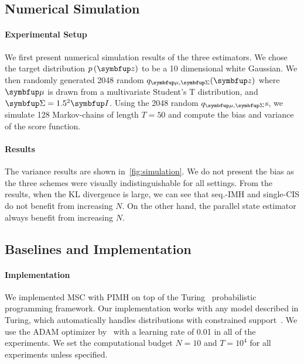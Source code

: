 \subsection{Numerical Simulation}
\paragraph{Experimental Setup}
We first present numerical simulation results of the three estimators.
We chose the target distribution \(p\left(\vz\right)\) to be a 10 dimensional white Gaussian.
We then randomly generated 2048 random \(q_{\vmu, \mSigma}(\vz)\) where \(\vmu\) is drawn from a multivariate Student's T distribution, and \(\mSigma = 1.5^2 \mI\).
Using the 2048 random \(q_{\vmu, \mSigma}\)s, we simulate 128 Markov-chains of length \(T=50\) and compute the bias and variance of the score function.

\paragraph{Results}
The variance results are shown in~\cref{fig:simulation}.
We do not present the bias as the three schemes were visually indistinguishable for all settings.
From the results, when the KL divergence is large, we can see that seq.-IMH and single-CIS do not benefit from increasing \(N\).
On the other hand, the parallel state estimator always benefit from increasing \(N\).

\subsection{Baselines and Implementation}
\paragraph{Implementation}
We implemented MSC with PIMH on top of the Turing~\citep{ge2018t} probabilistic programming framework.
Our implementation works with any model described in Turing, which automatically handles distributions with constrained support~\citep{JMLR:v18:16-107}.
We use the ADAM optimizer by~\citet{kingma_adam_2015} with a learning rate of 0.01 in all of the experiments.
We set the computational budget \(N=10\) and \(T=10^4\) for all experiments unless specified.

\vspace{-0.1in}
